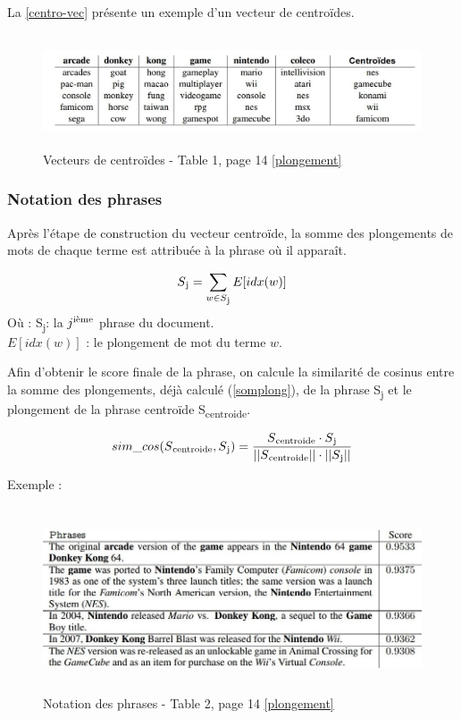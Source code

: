              \vspace*{0.5cm}
             La \autoref{centro-vec} présente un exemple d'un vecteur de centroïdes. 
              \begin{figure}[H]
                 \centering
                \includegraphics[height=95pt,width=420pt]{img/chapter3/centroideembed.jpg}
                \caption{Vecteurs de centroïdes - Table 1, page 14 \ref{plongement}}
                \label{centro-vec}
             \end{figure}

         \subsubsection{Notation des phrases}
         Après l'étape de construction du vecteur centroïde, la somme des plongements de mots de chaque terme  est attribuée à la phrase où il apparaît.\label{somplong}

        \begin{equation*}
         S\textsubscript{j} = \sum_{\substack{w\in S\textsubscript{j}}}
         E[idx(w)]
        \end{equation*}
        Où :
        S\textsubscript{j}: la $j\textsuperscript{ième}$ phrase du document. \\ 
        $E[idx(w)]$ : le plongement de mot du terme $w$.

        Afin d'obtenir le score finale de la phrase, on calcule la similarité de cosinus entre la somme des plongements, déjà calculé (\ref{somplong}), de la phrase S\textsubscript{j} et le plongement de la phrase centroïde S\textsubscript{centroide}.
        
        \[sim\_cos(S\textsubscript{centroide},S\textsubscript{j}) = \frac {S\textsubscript{centroide} \cdot S\textsubscript{j}}{||S\textsubscript{centroide}|| \cdot ||S\textsubscript{j}||}\]

        Exemple :
            \begin{figure}[H]
                \centering
                \includegraphics[height=155pt,width=400pt]{img/chapter3/scoreembed.jpg}
                \caption{Notation des phrases - Table 2, page 14 \ref{plongement}}
                \label{}
            \end{figure}

